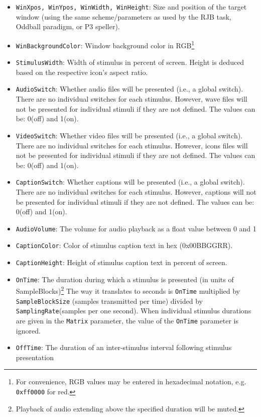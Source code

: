 \documentclass[letterpaper,oneside,12pt]{article}
\begin{document}
\begin{itemize}
 \item {\tt WinXpos, WinYpos, WinWidth, WinHeight}: Size and position of the target window (using the same scheme/parameters 
       as used by the RJB task, Oddball paradigm, or P3 speller).
 \item {\tt WinBackgroundColor}: Window background color in RGB\footnote{For convenience, RGB values
       may be entered in hexadecimal notation, e.g. \texttt{0xff0000} for red.}
 \item {\tt StimulusWidth}: Width of stimulus in percent of screen. Height is deduced based on the respective icon's aspect ratio.
 \item {\tt AudioSwitch}: Whether audio files will be presented
       (i.e., a global switch). There are no individual switches for each stimulus. However,
       wave files will not be presented for individual stimuli if they are not defined. The values can be: 0(off) and 1(on).
 \item {\tt VideoSwitch}: Whether video files will be presented
       (i.e., a global switch). There are no individual switches for each stimulus. However,
       icons files will not be presented for individual stimuli if they are not defined. The values can be: 0(off) and 1(on).
 \item {\tt CaptionSwitch}: Whether captions will be presented
       (i.e., a global switch). There are no individual switches for each stimulus. However,
       captions will not be presented for individual stimuli if they are not defined. The values can be: 0(off) and 1(on).
 \item {\tt AudioVolume}: The volume for audio playback as a float value between 0 and 1
 \item {\tt CaptionColor}: Color of stimulus caption text in hex (0x00BBGGRR).
 \item {\tt CaptionHeight}: Height of stimulus caption text in percent of screen.
 \item {\tt OnTime}: The duration during which a stimulus is presented (in units of
       SampleBlocks)\footnote{Playback of audio extending above the specified duration 
       will be muted.} The way it translates to seconds is {\tt OnTime} multiplied by {\tt SampleBlockSize}
       (samples transmitted per time) divided by {\tt SamplingRate}(samples per one second).
       When individual stimulus durations are given in the {\tt Matrix} parameter, the value of the {\tt OnTime}
       parameter is ignored.
 \item {\tt OffTime}: The duration of an inter-stimulus interval following stimulus presentation

\end{itemize}
\end{document}
